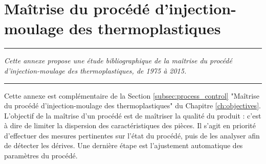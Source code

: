
\appendix
\renewcommand\chaptername{Annexe~}

\lhead[\fancyplain{}{\leftmark}]%
      {\fancyplain{}{}} %
\chead[\fancyplain{}{}]%
      {\fancyplain{}{}}
\rhead[\fancyplain{}{}]%
      {\fancyplain{}{\rightmark}}%
\lfoot[\fancyplain{}{}]%
      {\fancyplain{}{}}
\cfoot[\fancyplain{}{\thepage}]%
      {\fancyplain{}{\thepage}} %
\rfoot[\fancyplain{}{}]%
     {\fancyplain{}{\scriptsize}}



\chapter{Maîtrise du procédé d'injection-moulage des thermoplastiques}
\label{Ann:process_control}


\begin{center}
\rule{0.7\linewidth}{.5pt}
\begin{minipage}{0.7\linewidth}
\smallskip

\textit{
Cette annexe propose une étude bibliographique de la maîtrise du procédé d'injection-moulage des thermoplastiques, de 1975 à 2015.
}

\end{minipage}
\smallskip
\rule{0.7\linewidth}{.5pt}
\end{center}

\bigskip

Cette annexe est complémentaire de la Section \ref{subsec:process_control} "Maîtrise du procédé d'injection-moulage des thermoplastiques" du Chapitre \ref{ch:objectives}.
L'objectif de la maîtrise d'un procédé est de maîtriser la qualité du produit : c'est à dire de limiter la dispersion des caractéristiques des pièces.
Il s'agit en priorité d'effectuer des mesures pertinentes sur l'état du procédé, puis de les analyser afin de détecter les dérives.
Une dernière étape est l'ajustement automatique des paramètres du procédé.

